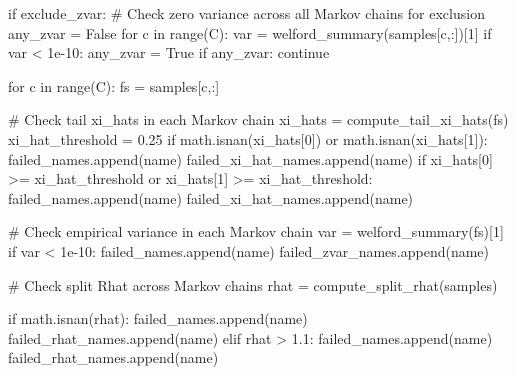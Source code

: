 \documentclass[
  letterpaper,
  DIV=11,
  numbers=noendperiod]{scrartcl}
\newenvironment{Shaded}{\begin{snugshade}}{\end{snugshade}}
\newcommand{\BuiltInTok}[1]{\textcolor[rgb]{0.00,0.23,0.31}{#1}}
\newcommand{\CommentTok}[1]{\textcolor[rgb]{0.37,0.37,0.37}{#1}}
\newcommand{\ControlFlowTok}[1]{\textcolor[rgb]{0.00,0.23,0.31}{#1}}
\newcommand{\DecValTok}[1]{\textcolor[rgb]{0.68,0.00,0.00}{#1}}
\newcommand{\FloatTok}[1]{\textcolor[rgb]{0.68,0.00,0.00}{#1}}
\newcommand{\KeywordTok}[1]{\textcolor[rgb]{0.00,0.23,0.31}{#1}}
\newcommand{\NormalTok}[1]{\textcolor[rgb]{0.00,0.23,0.31}{#1}}
\newcommand{\OperatorTok}[1]{\textcolor[rgb]{0.37,0.37,0.37}{#1}}
\newcommand{\VariableTok}[1]{\textcolor[rgb]{0.07,0.07,0.07}{#1}}
\begin{document}
\begin{Shaded}
\begin{Highlighting}[]
    \ControlFlowTok{if}\NormalTok{ exclude\_zvar:}
      \CommentTok{\# Check zero variance across all Markov chains for exclusion}
\NormalTok{      any\_zvar }\OperatorTok{=} \VariableTok{False}
      \ControlFlowTok{for}\NormalTok{ c }\KeywordTok{in} \BuiltInTok{range}\NormalTok{(C):}
\NormalTok{        var }\OperatorTok{=}\NormalTok{ welford\_summary(samples[c,:])[}\DecValTok{1}\NormalTok{]}
        \ControlFlowTok{if}\NormalTok{ var }\OperatorTok{\textless{}} \FloatTok{1e{-}10}\NormalTok{:}
\NormalTok{          any\_zvar }\OperatorTok{=} \VariableTok{True}
      \ControlFlowTok{if}\NormalTok{ any\_zvar:}
        \ControlFlowTok{continue}
    
    \ControlFlowTok{for}\NormalTok{ c }\KeywordTok{in} \BuiltInTok{range}\NormalTok{(C):}
\NormalTok{      fs }\OperatorTok{=}\NormalTok{ samples[c,:]}
            
      \CommentTok{\# Check tail xi\_hats in each Markov chain}
\NormalTok{      xi\_hats }\OperatorTok{=}\NormalTok{ compute\_tail\_xi\_hats(fs)}
\NormalTok{      xi\_hat\_threshold }\OperatorTok{=} \FloatTok{0.25}
      \ControlFlowTok{if}\NormalTok{ math.isnan(xi\_hats[}\DecValTok{0}\NormalTok{]) }\KeywordTok{or}\NormalTok{ math.isnan(xi\_hats[}\DecValTok{1}\NormalTok{]):}
\NormalTok{        failed\_names.append(name)}
\NormalTok{        failed\_xi\_hat\_names.append(name)}
      \ControlFlowTok{if}\NormalTok{ xi\_hats[}\DecValTok{0}\NormalTok{] }\OperatorTok{\textgreater{}=}\NormalTok{ xi\_hat\_threshold }\KeywordTok{or}\NormalTok{ xi\_hats[}\DecValTok{1}\NormalTok{] }\OperatorTok{\textgreater{}=}\NormalTok{ xi\_hat\_threshold:}
\NormalTok{        failed\_names.append(name)}
\NormalTok{        failed\_xi\_hat\_names.append(name)}
    
      \CommentTok{\# Check empirical variance in each Markov chain}
\NormalTok{      var }\OperatorTok{=}\NormalTok{ welford\_summary(fs)[}\DecValTok{1}\NormalTok{]}
      \ControlFlowTok{if}\NormalTok{ var }\OperatorTok{\textless{}} \FloatTok{1e{-}10}\NormalTok{:}
\NormalTok{        failed\_names.append(name)}
\NormalTok{        failed\_zvar\_names.append(name)}
    
    \CommentTok{\# Check split Rhat across Markov chains}
\NormalTok{    rhat }\OperatorTok{=}\NormalTok{ compute\_split\_rhat(samples)}
    
    \ControlFlowTok{if}\NormalTok{ math.isnan(rhat):}
\NormalTok{      failed\_names.append(name)}
\NormalTok{      failed\_rhat\_names.append(name)}
    \ControlFlowTok{elif}\NormalTok{ rhat }\OperatorTok{\textgreater{}} \FloatTok{1.1}\NormalTok{:}
\NormalTok{      failed\_names.append(name)}
\NormalTok{      failed\_rhat\_names.append(name)}
    

\end{Highlighting}
\end{Shaded}
\end{document}

